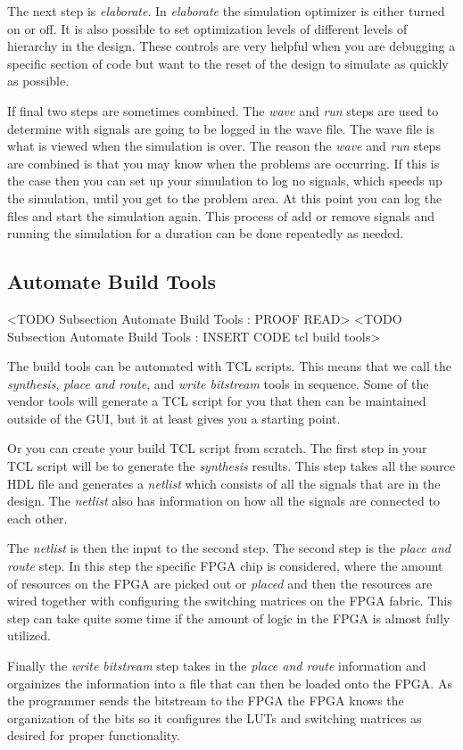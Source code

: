 The next step is \emph{elaborate}. In \emph{elaborate} the simulation optimizer is either turned on or off. It is also possible to set optimization levels of different levels of hierarchy in the design. These controls are very helpful when you are debugging a specific section of code but want to the reset of the design to simulate as quickly as possible.

If final two steps are sometimes combined. The \emph{wave} and \emph{run} steps are used to determine with signals are going to be logged in the wave file. The wave file is what is viewed when the simulation is over. The reason the \emph{wave} and \emph{run} steps are combined is that you may know when the problems are occurring. If this is the case then you can set up your simulation to log no signals, which speeds up the simulation, until you get to the problem area. At this point you can log the files and start the simulation again. This process of add or remove signals and running the simulation for a duration can be done repeatedly as needed. 
	
\subsection{Automate Build Tools}
	<TODO Subsection Automate Build Tools : PROOF READ>
	<TODO Subsection Automate Build Tools : INSERT CODE tcl build tools>

The build tools can be automated with \ac{TCL} scripts. This means that we call the \emph{synthesis}, \emph{place and route}, and \emph{write bitstream} tools in sequence. Some of the vendor tools will generate a \ac{TCL} script for you that then can be maintained outside of the \ac{GUI}, but it at least gives you a starting point. 

Or you can create your build \ac{TCL} script from scratch. The first step in your \ac{TCL} script will be to generate the \emph{synthesis} results. This step takes all the source \ac{HDL} file and generates a \emph{netlist} which consists of all the signals that are in the design. The \emph{netlist} also has information on how all the signals are connected to each other.

The \emph{netlist} is then the input to the second step. The second step is the \emph{place and route} step. In this step the specific \ac{FPGA} chip is considered, where the amount of resources on the \ac{FPGA} are picked out or \emph{placed} and then the resources are wired together with configuring the switching matrices on the \ac{FPGA} fabric. This step can take quite some time if the amount of logic in the \ac{FPGA} is almost fully utilized. 

Finally the \emph{write bitstream} step takes in the \emph{place and route} information and orgainizes the information into a file that can then be loaded onto the \ac{FPGA}. As the programmer sends the bitstream to the \ac{FPGA} the \ac{FPGA} knows the organization of the bits so it configures the \ac{LUT}s and switching matrices as desired for proper functionality. 
	
		
	